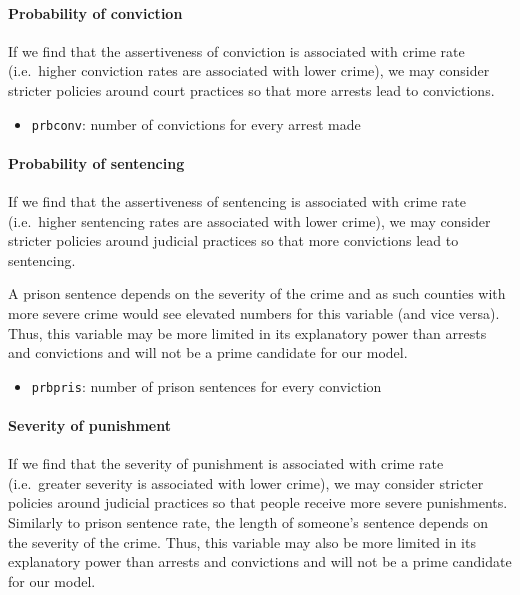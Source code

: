 \documentclass[]{article}
\providecommand{\tightlist}{%
  \setlength{\itemsep}{0pt}\setlength{\parskip}{0pt}}
\let\oldparagraph\paragraph
\renewcommand{\paragraph}[1]{\oldparagraph{#1}\mbox{}}
\begin{document}
\hypertarget{probability-of-conviction}{%
\paragraph{Probability of conviction}\label{probability-of-conviction}}

If we find that the assertiveness of conviction is associated with crime
rate (i.e.~higher conviction rates are associated with lower crime), we
may consider stricter policies around court practices so that more
arrests lead to convictions.

\begin{itemize}
\tightlist
\item
  \texttt{prbconv}: number of convictions for every arrest made
\end{itemize}

\hypertarget{probability-of-sentencing}{%
\paragraph{Probability of sentencing}\label{probability-of-sentencing}}

If we find that the assertiveness of sentencing is associated with crime
rate (i.e.~higher sentencing rates are associated with lower crime), we
may consider stricter policies around judicial practices so that more
convictions lead to sentencing.

A prison sentence depends on the severity of the crime and as such
counties with more severe crime would see elevated numbers for this
variable (and vice versa). Thus, this variable may be more limited in
its explanatory power than arrests and convictions and will not be a
prime candidate for our model.

\begin{itemize}
\tightlist
\item
  \texttt{prbpris}: number of prison sentences for every conviction
\end{itemize}

\hypertarget{severity-of-punishment}{%
\paragraph{Severity of punishment}\label{severity-of-punishment}}

If we find that the severity of punishment is associated with crime rate
(i.e.~greater severity is associated with lower crime), we may consider
stricter policies around judicial practices so that people receive more
severe punishments. Similarly to prison sentence rate, the length of
someone's sentence depends on the severity of the crime. Thus, this
variable may also be more limited in its explanatory power than arrests
and convictions and will not be a prime candidate for our model.
\end{document}
